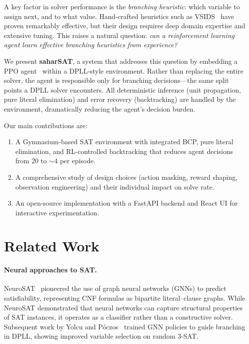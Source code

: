 \documentclass{article}
\begin{document}
A key factor in solver performance is the \emph{branching heuristic}: which variable to assign next, and to what value. Hand-crafted heuristics such as VSIDS~\cite{moskewicz2001chaff} have proven remarkably effective, but their design requires deep domain expertise and extensive tuning. This raises a natural question: \emph{can a reinforcement learning agent learn effective branching heuristics from experience?}

We present \textbf{saharSAT}, a system that addresses this question by embedding a PPO agent~\cite{schulman2017proximal} within a DPLL-style environment. Rather than replacing the entire solver, the agent is responsible only for branching decisions---the same split points a DPLL solver encounters. All deterministic inference (unit propagation, pure literal elimination) and error recovery (backtracking) are handled by the environment, dramatically reducing the agent's decision burden.

Our main contributions are:
\begin{enumerate}
    \item A Gymnasium-based SAT environment with integrated BCP, pure literal elimination, and RL-controlled backtracking that reduces agent decisions from 20 to ${\sim}4$ per episode.
    \item A comprehensive study of design choices (action masking, reward shaping, observation engineering) and their individual impact on solve rate.
    \item An open-source implementation with a FastAPI backend and React UI for interactive experimentation.
\end{enumerate}

\section{Related Work}

\paragraph{Neural approaches to SAT.}
NeuroSAT~\cite{selsam2019learning} pioneered the use of graph neural networks (GNNs) to predict satisfiability, representing CNF formulas as bipartite literal--clause graphs. While NeuroSAT demonstrated that neural networks can capture structural properties of SAT instances, it operates as a classifier rather than a constructive solver. Subsequent work by Yolcu and P\'oczos~\cite{yolcu2019learning} trained GNN policies to guide branching in DPLL, showing improved variable selection on random 3-SAT.
\end{document}
